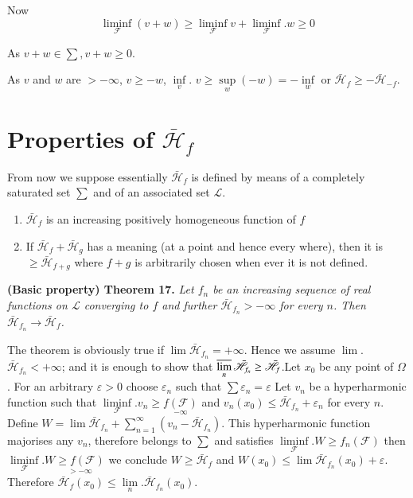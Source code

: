 Now
$$
\liminf \limits_{\mathscr{F}} (v+w) \ge \liminf \limits_{\mathscr{F}}v
+ \liminf \limits_{\mathscr{F}}.w \ge 0 
$$

As $v + w \in \sum,  v + w \ge 0$.

As $v$ and $w$ are $> - \infty$, $v \ge - w$, $\inf \limits_{v}$. $v
\ge \sup \limits_{w} (-w) = -\inf \limits_{w}$ or $\bar{\mathscr{H}}_f
\ge - \bar{\mathscr{H}}_{-f}$. 

\section{Properties of \texorpdfstring{$\bar{\mathscr{H}}_f$}{Hf}}\label{p4:chap5:sec23} %

From now we suppose essentially $\bar{\mathscr{H}}_f$ is defined by
means of a completely saturated set $\sum$ and of an associated set
$\mathscr{L}$. 

\begin{prop}\label{p4:chap5:sec23:prop13} %
  \begin{enumerate}[\rm (i)]
  \item $\bar{\mathscr{H}}_f$ is an increasing positively homogeneous
    fun\-ction of $f$ 
  \item If $\bar{\mathscr{H}}_f + \bar{\mathscr{H}}_g$ has a meaning
    (at a point and hence every where), then it is $\ge
    \bar{\mathscr{H}}_{f+g}$ where $f + g$ is arbitrarily chosen when
    ever it is not defined.	 
  \end{enumerate}
\end{prop}

\noindent 
\textbf{(Basic property) Theorem 17.}\label{p4:chap5:sec23:thm17} %
\textit{Let $f_n$ be an increasing sequence of real functions on $\mathscr{L}$
converging to $f$ and further $\bar{\mathscr{H}}_{f_n} > - \infty$ for
every $n$. Then $\bar{\mathscr{H}}_{f_n} \rightarrow
\bar{\mathscr{H}}_f$. }

The theorem is obviously true if $\lim \bar{\mathscr{H}}_{f_n} = +
\infty$. Hence we assume $\lim$. $\bar{\mathscr{H}}_{f_n} < + \infty$;
and it is enough to show that $\varlimsup\limits_{n}
\bar{\mathscr{H}}_{f_n} \ge \bar{\mathscr{H}}_f$.\pageoriginale Let $x_0$ be any
point of $\Omega$. For an arbitrary $\varepsilon > 0$ choose
$\varepsilon_n$ such that $\sum \varepsilon_n = \varepsilon$ Let $v_n$
be a hyperharmonic function such that $\liminf
\limits_{\mathscr{F}}. v_n \ge {\underset{- \infty}{f (\mathscr{F})}}$
and $v_n (x_0) \le \bar{\mathscr{H}}_{f_n} + \varepsilon_n$ for every
$n$. Define $W = \lim \bar{\mathscr{H}}_{f_n} + \sum \limits^\infty_{n
  = 1}(v_n - \bar{\mathscr{H}}_{f_n})$. This hyperharmonic function
majorises any $v_n$, therefore belongs to $\sum$ and satisfies
$\liminf\limits_{\mathscr{F}}. W \ge f_n (\mathscr{F})$ then $\liminf
\limits_{\mathscr{F}}. W {\underset{> - \infty}{\ge f (\mathscr{F})}}$
we conclude $W \ge \bar{\mathscr{H}}_f$ and $W (x_0) \le \lim
\bar{\mathscr{H}}_{f_n} (x_0) + \varepsilon$. Therefore
$\bar{\mathscr{H}}_f(x_0) \le \lim
\limits_{n}. \bar{\mathscr{H}}_{f_n} (x_0)$. 

